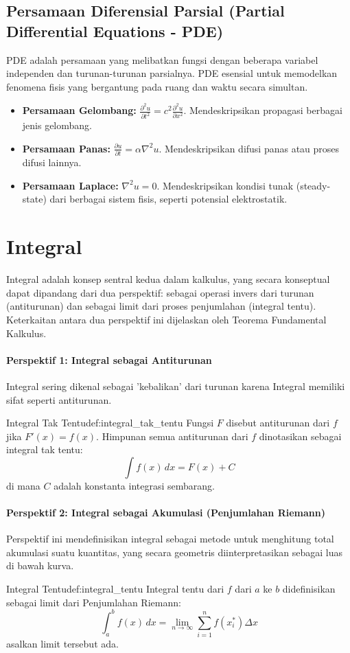 \documentclass[12pt, a4paper]{article}
\begin{document}
\subsection{Persamaan Diferensial Parsial (Partial Differential Equations - PDE)}
PDE adalah persamaan yang melibatkan fungsi dengan beberapa variabel independen dan turunan-turunan parsialnya. PDE esensial untuk memodelkan fenomena fisis yang bergantung pada ruang dan waktu secara simultan.
\begin{itemize}
    \item \textbf{Persamaan Gelombang:} $\frac{\partial^2 u}{\partial t^2} = c^2 \frac{\partial^2 u}{\partial x^2}$. Mendeskripsikan propagasi berbagai jenis gelombang.
    \item \textbf{Persamaan Panas:} $\frac{\partial u}{\partial t} = \alpha \nabla^2 u$. Mendeskripsikan difusi panas atau proses difusi lainnya.
    \item \textbf{Persamaan Laplace:} $\nabla^2 u = 0$. Mendeskripsikan kondisi tunak (steady-state) dari berbagai sistem fisis, seperti potensial elektrostatik.
\end{itemize}

\section{Integral}
Integral adalah konsep sentral kedua dalam kalkulus, yang secara konseptual dapat dipandang dari dua perspektif: sebagai operasi invers dari turunan (antiturunan) dan sebagai limit dari proses penjumlahan (integral tentu). Keterkaitan antara dua perspektif ini dijelaskan oleh Teorema Fundamental Kalkulus.

\paragraph{Perspektif 1: Integral sebagai Antiturunan} Integral sering dikenal sebagai 'kebalikan' dari turunan karena Integral memiliki sifat seperti antiturunan.
\begin{definition}{Integral Tak Tentu}{def:integral_tak_tentu}
Fungsi $F$ disebut antiturunan dari $f$ jika $F'(x) = f(x)$. Himpunan semua antiturunan dari $f$ dinotasikan sebagai integral tak tentu:
\[
\int f(x) \,dx = F(x) + C
\]
di mana $C$ adalah konstanta integrasi sembarang.
\end{definition}

\paragraph{Perspektif 2: Integral sebagai Akumulasi (Penjumlahan Riemann)}
Perspektif ini mendefinisikan integral sebagai metode untuk menghitung total akumulasi suatu kuantitas, yang secara geometris diinterpretasikan sebagai luas di bawah kurva.
\begin{definition}{Integral Tentu}{def:integral_tentu}
Integral tentu dari $f$ dari $a$ ke $b$ didefinisikan sebagai limit dari Penjumlahan Riemann:
\[
\int_{a}^{b} f(x) \,dx = \lim_{n \to \infty} \sum_{i=1}^{n} f(x_i^*) \Delta x
\]
asalkan limit tersebut ada.
\end{definition}
\end{document}
